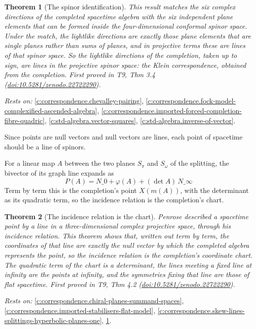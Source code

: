 \documentclass[11pt]{article}
\newtheorem{theorem}{Theorem}[section]
\theoremstyle{definition}
\theoremstyle{plain}
\providecommand{\Som}{}\renewcommand{\Som}{S_\omega}
\providecommand{\Spi}{}\renewcommand{\Spi}{S_\pi}
\begin{document}
\begin{theorem}[The spinor identification]\label{c:correspondence.spinor-identification}
This result matches the six complex directions of the completed spacetime algebra with the six independent plane elements that can be formed inside the four-dimensional conformal spinor space. Under the match, the lightlike directions are exactly those plane elements that are single planes rather than sums of planes, and in projective terms these are lines of that spinor space. So the lightlike directions of the completion, taken up to sign, are lines in the projective spinor space: the Klein correspondence, obtained from the completion.
\emph{First proved in} T9, Thm 3.4 (\href{https://doi.org/10.5281/zenodo.22722290}{doi:10.5281/zenodo.22722290}).
\end{theorem}
\noindent\emph{Rests on:} \ref{c:correspondence.chevalley-pairing}, \ref{c:correspondence.fock-model-complexified-ascended-algebra}, \ref{c:correspondence.imported-forced-completion-fibre-quadric}, \ref{c:std-algebra.vector-squares}, \ref{c:std-algebra.inverse-of-vector}.

Since points are null vectors and null vectors are lines, each point of spacetime should be a line of spinors.

For a linear map $A$ between the two planes $\Spi$ and $\Som$ of the splitting, the bivector of its graph line expands as \[ P(A) = N\_0 + \varphi(A) + (\det A)\, N\_\infty \] Term by term this is the completion's point $X(m(A))$, with the determinant as its quadratic term, so the incidence relation is the completion's chart.

\begin{theorem}[The incidence relation is the chart]\label{c:correspondence.incidence-relation-chart}
Penrose described a spacetime point by a line in a three-dimensional complex projective space, through his incidence relation. This theorem shows that, written out term by term, the coordinates of that line are exactly the null vector by which the completed algebra represents the point, so the incidence relation is the completion's coordinate chart. The quadratic term of the chart is a determinant, the lines meeting a fixed line at infinity are the points at infinity, and the symmetries fixing that line are those of flat spacetime.
\emph{First proved in} T9, Thm 4.2 (\href{https://doi.org/10.5281/zenodo.22722290}{doi:10.5281/zenodo.22722290}).
\end{theorem}
\noindent\emph{Rests on:} \ref{c:correspondence.chiral-planes-summand-spaces}, \ref{c:correspondence.imported-stabilisers-flat-model}, \ref{c:correspondence.skew-lines-splittings-hyperbolic-planes-one}, \ref{c:correspondence.spinor-identification}.
\end{document}

